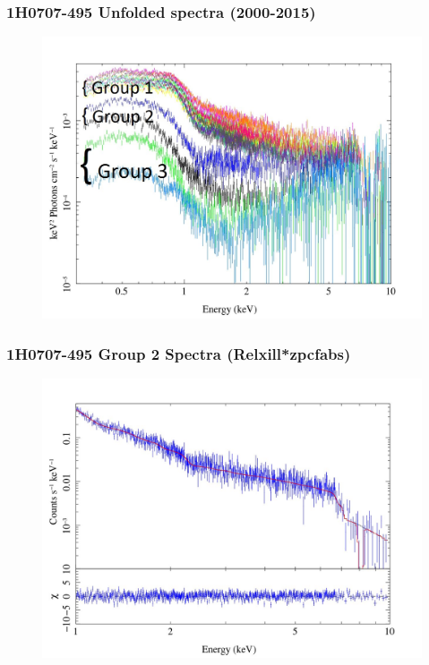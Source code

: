 \documentclass[]{beamer}
\begin{document}
\begin{frame}
\frametitle{1H0707-495 Unfolded spectra (2000-2015)}
\begin{figure}\centering
\includegraphics[scale=.25]{1H0707-495_Unfolded_Spectra_Grps.jpeg}
\end{figure}
\end{frame}

\begin{frame}
\frametitle{1H0707-495 Group 2 Spectra (Relxill*zpcfabs)}
\begin{figure}\centering
\includegraphics[scale=.25]{1H0707-495_Grp2_Spectra.jpeg}
\end{figure}
\end{frame}
\end{document}
